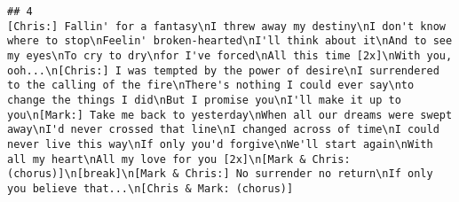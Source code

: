 \documentclass[]{article}
\begin{document}
\begin{verbatim}
## 4                                                                                                                                                                                                                                                                                                                                                                                                                                                                                                                                                                                                                                                                                                                                                                                                                                                                                                                                                                                                                                                                                                                                                                                                                                                                                                                                                                                                                                                                                                                                                                                                                                                                                                                                                                                                                                                                                                                                                                                                                                                                                                                                                                                                                                                                                                                          [Chris:] Fallin' for a fantasy\nI threw away my destiny\nI don't know where to stop\nFeelin' broken-hearted\nI'll think about it\nAnd to see my eyes\nTo cry to dry\nfor I've forced\nAll this time [2x]\nWith you, ooh...\n[Chris:] I was tempted by the power of desire\nI surrendered to the calling of the fire\nThere's nothing I could ever say\nto change the things I did\nBut I promise you\nI'll make it up to you\n[Mark:] Take me back to yesterday\nWhen all our dreams were swept away\nI'd never crossed that line\nI changed across of time\nI could never live this way\nIf only you'd forgive\nWe'll start again\nWith all my heart\nAll my love for you [2x]\n[Mark & Chris: (chorus)]\n[break]\n[Mark & Chris:] No surrender no return\nIf only you believe that...\n[Chris & Mark: (chorus)]

\end{verbatim}
\end{document}
